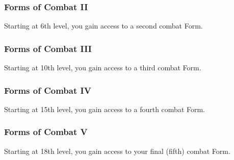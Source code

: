 \subsubsection{Forms of Combat II}
Starting at 6th level,
you gain access to a second combat Form.

\subsubsection{Forms of Combat III}
Starting at 10th level,
you gain access to a third combat Form.

\subsubsection{Forms of Combat IV}
Starting at 15th level,
you gain access to a fourth combat Form.

\subsubsection{Forms of Combat V}
Starting at 18th level,
you gain access to your final (fifth) combat Form.